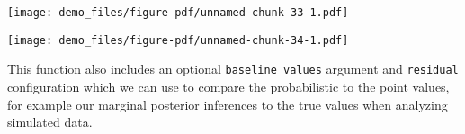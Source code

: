 \documentclass[
  letterpaper,
  DIV=11,
  numbers=noendperiod]{scrartcl}
\newenvironment{Shaded}{\begin{snugshade}}{\end{snugshade}}
\newcommand{\AttributeTok}[1]{\textcolor[rgb]{0.40,0.45,0.13}{#1}}
\newcommand{\ControlFlowTok}[1]{\textcolor[rgb]{0.00,0.23,0.31}{#1}}
\newcommand{\DecValTok}[1]{\textcolor[rgb]{0.68,0.00,0.00}{#1}}
\newcommand{\FunctionTok}[1]{\textcolor[rgb]{0.28,0.35,0.67}{#1}}
\newcommand{\NormalTok}[1]{\textcolor[rgb]{0.00,0.23,0.31}{#1}}
\newcommand{\OtherTok}[1]{\textcolor[rgb]{0.00,0.23,0.31}{#1}}
\newcommand{\SpecialCharTok}[1]{\textcolor[rgb]{0.37,0.37,0.37}{#1}}
\newcommand{\StringTok}[1]{\textcolor[rgb]{0.13,0.47,0.30}{#1}}
\begin{document}
\texttt{[image: demo\_files/figure-pdf/unnamed-chunk-33-1.pdf]}

\begin{Shaded}
\end{Shaded}

\texttt{[image: demo\_files/figure-pdf/unnamed-chunk-34-1.pdf]}

This function also includes an optional \texttt{baseline\_values}
argument and \texttt{residual} configuration which we can use to compare
the probabilistic to the point values, for example our marginal
posterior inferences to the true values when analyzing simulated data.
\end{document}
